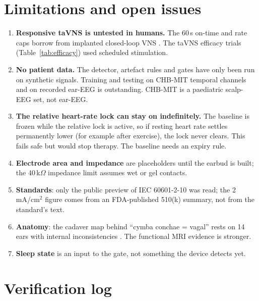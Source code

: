 \documentclass[10pt,a4paper]{article}
\begin{document}
\section{Limitations and open issues}\label{sec:limits}
\begin{enumerate}
  \item \textbf{Responsive taVNS is untested in humans.} The 60\,s on-time and rate caps borrow from implanted
        closed-loop VNS \parencite{fisher2016,boon2015}. The taVNS efficacy trials (Table~\ref{tab:efficacy}) used
        scheduled stimulation.
  \item \textbf{No patient data.} The detector, artefact rules and gates have only been run on synthetic signals.
        Training and testing on CHB-MIT temporal channels and on recorded ear-EEG is outstanding. CHB-MIT is a
        paediatric scalp-EEG set, not ear-EEG.
  \item \textbf{The relative heart-rate lock can stay on indefinitely.} The baseline is frozen while the relative lock
        is active, so if resting heart rate settles permanently lower (for example after exercise), the lock never
        clears. This fails safe but would stop therapy. The baseline needs an expiry rule.
  \item \textbf{Electrode area and impedance} are placeholders until the earbud is built; the 40\,k$\Omega$ impedance
        limit assumes wet or gel contacts.
  \item \textbf{Standards}: only the public preview of IEC 60601-2-10 was read; the 2\,mA/cm$^2$ figure comes from an
        FDA-published 510(k) summary, not from the standard's text.
  \item \textbf{Anatomy}: the cadaver map behind ``cymba conchae = vagal'' rests on 14 ears with internal
        inconsistencies \parencite{butt2020}. The functional MRI evidence \parencite{frangos2015,yakunina2017} is
        stronger.
  \item \textbf{Sleep state} is an input to the gate, not something the device detects yet.
\end{enumerate}

\appendix
\section{Verification log}\label{app:log}
\end{document}
